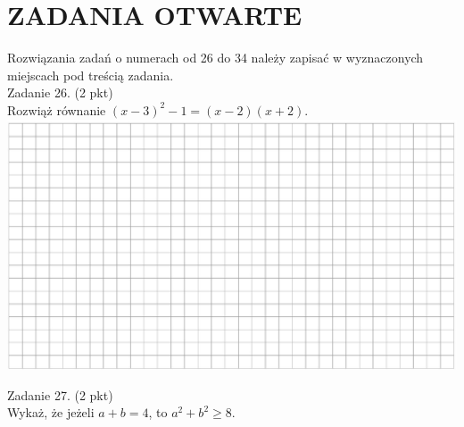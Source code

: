 \documentclass[10pt]{article}
\begin{document}
\section*{ZADANIA OTWARTE}
Rozwiązania zadań o numerach od 26 do 34 należy zapisać w wyznaczonych miejscach pod treścią zadania.\\
Zadanie 26. (2 pkt)\\
Rozwiąż równanie \((x-3)^{2}-1=(x-2)(x+2)\).\\
\includegraphics[max width=\textwidth, center]{2024_11_21_55bf50695fa934dbe20eg-08}

Zadanie 27. (2 pkt)\\
Wykaż, że jeżeli \(a+b=4\), to \(a^{2}+b^{2} \geq 8\).
\end{document}
